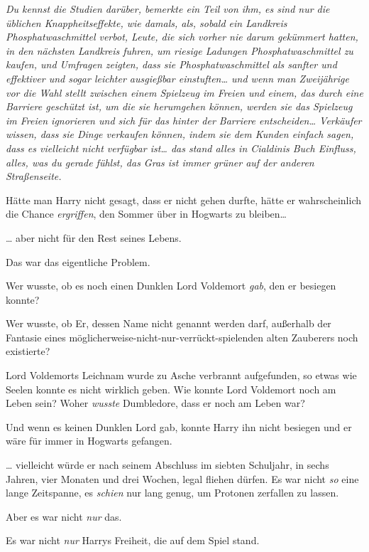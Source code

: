 {\emph{\emph{Du} kennst \emph{die} \emph{Studien} \emph{darüber}, bemerkte ein Teil von ihm, \emph{es sind nur die üblichen Knappheitseffekte}, \emph{wie damals, als, sobald ein Landkreis Phosphatwaschmittel verbot, Leute, die sich vorher nie darum gekümmert hatten, in den nächsten Landkreis fuhren, um riesige Ladungen Phosphatwaschmittel zu kaufen, und Umfragen zeigten, dass sie Phosphatwaschmittel als sanfter und effektiver und sogar leichter ausgießbar einstuften}… \emph{und wenn man Zweijährige vor die Wahl stellt zwischen einem Spielzeug im Freien und einem, das durch eine Barriere geschützt ist, um die sie herumgehen können, werden sie das Spielzeug im Freien ignorieren und sich für das hinter der Barriere entscheiden}… \emph{Verkäufer wissen, dass sie Dinge verkaufen können, indem sie dem Kunden einfach sagen, dass es vielleicht nicht verfügbar ist}… \emph{das stand alles in Cialdinis Buch} Einfluss, \emph{alles, was du gerade fühlst, das Gras ist immer grüner auf der anderen Straßenseite.}}

Hätte man Harry nicht gesagt, dass er nicht gehen durfte, hätte er wahrscheinlich die Chance \emph{ergriffen}, den Sommer über in Hogwarts zu bleiben…

… aber nicht für den Rest seines Lebens.

Das war das eigentliche Problem.

Wer wusste, ob es noch einen Dunklen Lord Voldemort \emph{gab}, den er besiegen konnte?

Wer wusste, ob Er, dessen Name nicht genannt werden darf, außerhalb der Fantasie eines möglicherweise-nicht-nur-verrückt-spielenden alten Zauberers noch existierte?

Lord Voldemorts Leichnam wurde zu Asche verbrannt aufgefunden, so etwas wie Seelen konnte es nicht wirklich geben. Wie konnte Lord Voldemort noch am Leben sein? Woher \emph{wusste} Dumbledore, dass er noch am Leben war?

Und wenn es keinen Dunklen Lord gab, konnte Harry ihn nicht besiegen und er wäre für immer in Hogwarts gefangen.

… vielleicht würde er nach seinem Abschluss im siebten Schuljahr, in sechs Jahren, vier Monaten und drei Wochen, legal fliehen dürfen. Es war nicht \emph{so} eine lange Zeitspanne, es \emph{schien} nur lang genug, um Protonen zerfallen zu lassen.

Aber es war nicht \emph{nur} das.

Es war nicht \emph{nur} Harrys Freiheit, die auf dem Spiel stand.

}
